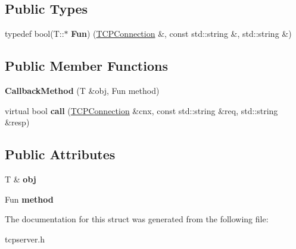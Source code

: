 \subsection*{Public Types}
\begin{DoxyCompactItemize}
\item 
\mbox{\label{structcppu_1_1_t_c_p_server_1_1_callback_method_a6f71d878bd072aadf40d96d1db18eecd}} 
typedef bool(T\+::$\ast$ {\bfseries Fun}) (\mbox{\hyperlink{classcppu_1_1_t_c_p_connection}{T\+C\+P\+Connection}} \&, const std\+::string \&, std\+::string \&)
\end{DoxyCompactItemize}
\subsection*{Public Member Functions}
\begin{DoxyCompactItemize}
\item 
\mbox{\label{structcppu_1_1_t_c_p_server_1_1_callback_method_a0c6ceee6db8c67ef56fb26d1df52140f}} 
{\bfseries Callback\+Method} (T \&obj, Fun method)
\item 
\mbox{\label{structcppu_1_1_t_c_p_server_1_1_callback_method_a0c11039d0ed983c03a614d0764df3793}} 
virtual bool {\bfseries call} (\mbox{\hyperlink{classcppu_1_1_t_c_p_connection}{T\+C\+P\+Connection}} \&cnx, const std\+::string \&req, std\+::string \&resp)
\end{DoxyCompactItemize}
\subsection*{Public Attributes}
\begin{DoxyCompactItemize}
\item 
\mbox{\label{structcppu_1_1_t_c_p_server_1_1_callback_method_ae480535d346efc119fb5c43880f349c8}} 
T \& {\bfseries obj}
\item 
\mbox{\label{structcppu_1_1_t_c_p_server_1_1_callback_method_aab858a039ddee71fb65a0e35c173f067}} 
Fun {\bfseries method}
\end{DoxyCompactItemize}


The documentation for this struct was generated from the following file\+:\begin{DoxyCompactItemize}
\item 
tcpserver.\+h\end{DoxyCompactItemize}
